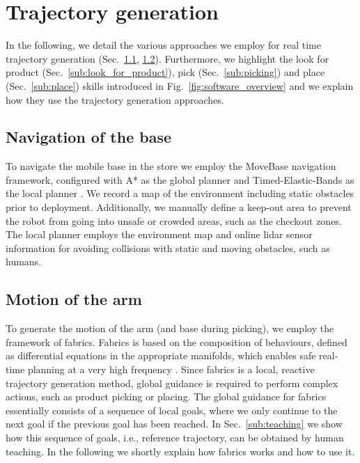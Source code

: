 \section{Trajectory generation}
\label{sec:trajectory_generation}


In the following, we detail the various approaches we employ for real time trajectory generation (Sec.~\ref{sub:base_motion}, \ref{sub:arm_motion}). Furthermore, we highlight the look for product (Sec.~\ref{sub:look_for_product}), pick (Sec.~\ref{sub:picking}) and place (Sec.~\ref{sub:place}) skills introduced in Fig.~\ref{fig:software_overview} and we explain how they use the trajectory generation approaches. %

\subsection{Navigation of the base}
\label{sub:base_motion}
To navigate the mobile base in the store we employ the MoveBase navigation framework, configured with A* as the global planner and Timed-Elastic-Bands as the local planner \cite{rosmann2017integrated}.
We record a map of the environment including static obstacles prior to deployment.
Additionally, we manually define a keep-out
area to prevent the robot from going into unsafe or crowded areas, such as the checkout zones. The local planner employs the environment map and online lidar sensor information for avoiding collisions with static and moving obstacles, such as humans.

\subsection{Motion of the arm}
\label{sub:arm_motion}
To generate the motion of the arm (and base during picking), we employ the framework of \ac{fabrics}.
Fabrics is based on the composition of behaviours, defined as differential equations in the appropriate manifolds, which enables safe real-time planning at a very high frequency \cite{ratliff2023fabrics,van2022geometric,spahn2023}. Since \ac{fabrics} is a local, reactive trajectory generation method, global guidance is required to perform complex actions, such as product picking or placing. 
The global guidance for fabrics essentially consists of a sequence of local goals, where we only continue to the next goal if the previous goal has been reached. In Sec.~\ref{sub:teaching} we show how this sequence of goals, i.e., reference trajectory, can be obtained by human teaching. In the following we shortly explain how \ac{fabrics} works and how to use it.



